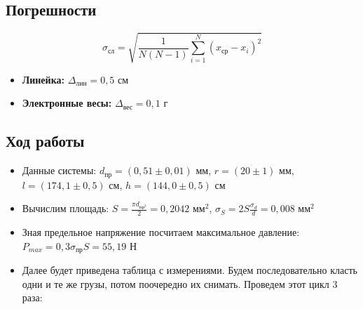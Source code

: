 \documentclass[a4paper, 12pt]{article}
\begin{document}
\begin{center}
    \bigskip

    \begin{center}
    \subsection*{Погрешности}

    \begin{equation}
        \sigma_\text{сл}=\sqrt{\frac{1}{N\left( N - 1 \right)}\sum_{i=1}^{N}\left( x_\text{ср} - x_i \right)^2 }
    \end{equation}

    \begin{itemize}
	\item \textbf{Линейка:} $ \Delta_\text{лин} = 0,5 $ см
	\item \textbf{Электронные весы:} $ \Delta_\text{вес} = 0,1 $ г
    \end{itemize}

\end{center}
\end{center}

\newpage

\begin{center}
    
\section*{Ход работы}
\begin{itemize}
 
\item Данные системы: \newline 
    $ d_\text{пр} = (0,51 \pm 0,01) \text{ мм}$, $ r = (20 \pm 1) \text{ мм}$, $ l = (174,1 \pm 0,5) \text{ см}$, $ h = (144,0 \pm 0,5) \text{ см}$

\item Вычислим площадь: \newline
    $ S = \frac{\pi d_{\text{пр}^2}}{2} = 0,2042 \text{ мм}^2$, $\sigma_{S} =  2S\frac{\sigma_{d}}{d} = 0,008 \text{ мм}^2$

\item Зная предельное напряжение посчитаем максимальное давление: \newline
    $ P_{max} = 0,3 \sigma_{\text{пр}}S = 55,19 \text{ Н}$

\item Далее будет приведена таблица с измерениями. Будем последовательно класть одни и те
же грузы, потом поочередно их снимать. Проведем этот цикл 3
раза:
\end{itemize}

\end{center}
\end{document}
